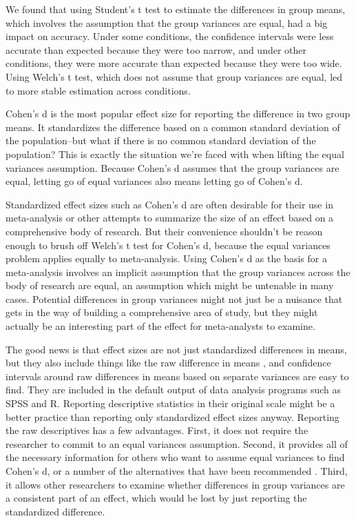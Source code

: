 \documentclass[man,a4paper,noextraspace,apacite]{apa6}
\begin{document}
    We found that using Student's t test to estimate the differences in group 
means, which involves the assumption that the group variances are equal, had a 
big impact on accuracy. Under some conditions, the confidence intervals were 
less accurate than expected because they were too narrow, and under other 
conditions, they were more accurate than expected because they were too wide. 
Using Welch's t test, which does not assume that group variances are equal, led 
to more stable estimation across conditions.
    
    Cohen's d \cite{Cohen1992} is the most popular effect size for reporting 
the difference in two group means. It standardizes the difference based on a 
common standard deviation of the population--but what if there is no common 
standard deviation of the population? This is exactly the situation we're faced 
with when lifting the equal variances assumption. Because Cohen's d assumes 
that the group variances are equal, letting go of equal variances also means 
letting go of Cohen's d. 
    
    Standardized effect sizes such as Cohen's d are often desirable for their 
use in meta-analysis or other attempts to summarize the size of an effect based 
on a comprehensive body of research. But their convenience shouldn't be reason 
enough to brush off Welch's t test for Cohen's d, because the equal variances 
problem applies equally to meta-analysis. Using Cohen's d as the basis for a 
meta-analysis involves an implicit assumption that the group variances across 
the body of research are equal, an assumption which might be untenable in many 
cases. Potential differences in group variances might not just be a nuisance 
that gets in the way of building a comprehensive area of study, but they might 
actually be an interesting part of the effect for meta-analysts to examine. 
    
    The good news is that effect sizes are not just standardized differences in 
means, but they also include things like the raw difference in means 
\cite{Cumming2014, Kelley2012}, and confidence intervals around raw differences 
in means based on separate variances are easy to find. They are included in the 
default output of data analysis programs such as SPSS and R. Reporting 
descriptive statistics in their original scale might be a better practice than 
reporting only standardized effect sizes anyway. Reporting the raw descriptives 
has a few advantages. First, it does not require the researcher to commit to an 
equal variances assumption. Second, it provides all of the necessary 
information for others who want to assume equal variances to find Cohen's d, or 
a number of the alternatives that have been recommended \cite{Peng2013, 
Grissom2001}. Third, it allows other researchers to examine whether differences 
in group variances are a consistent part of an effect, which would be lost by 
just reporting the standardized difference.
\end{document}
